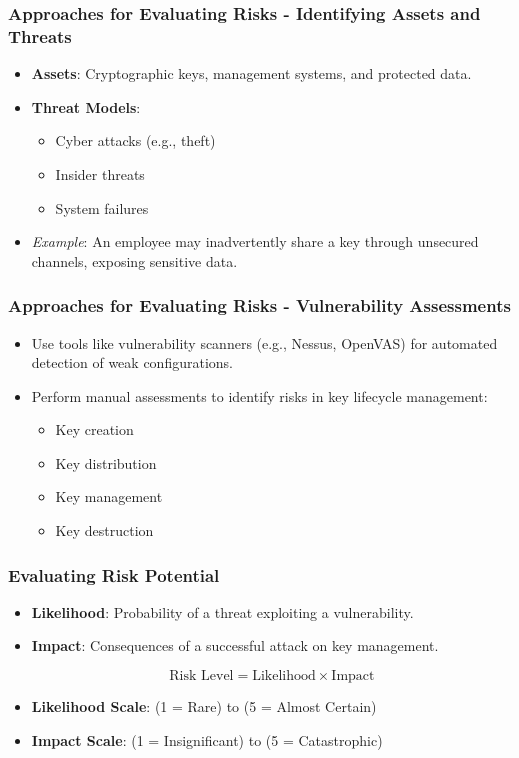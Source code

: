 \documentclass{beamer}
\begin{document}
\begin{frame}[fragile]
    \frametitle{Approaches for Evaluating Risks - Identifying Assets and Threats}
    \begin{itemize}
        \item \textbf{Assets}: Cryptographic keys, management systems, and protected data.
        \item \textbf{Threat Models}:
        \begin{itemize}
            \item Cyber attacks (e.g., theft)
            \item Insider threats
            \item System failures
        \end{itemize}
        \item \textit{Example}: An employee may inadvertently share a key through unsecured channels, exposing sensitive data.
    \end{itemize}
\end{frame}

\begin{frame}[fragile]
    \frametitle{Approaches for Evaluating Risks - Vulnerability Assessments}
    \begin{itemize}
        \item Use tools like vulnerability scanners (e.g., Nessus, OpenVAS) for automated detection of weak configurations.
        \item Perform manual assessments to identify risks in key lifecycle management:
        \begin{itemize}
            \item Key creation
            \item Key distribution
            \item Key management
            \item Key destruction
        \end{itemize}
    \end{itemize}
\end{frame}

\begin{frame}[fragile]
    \frametitle{Evaluating Risk Potential}
    \begin{itemize}
        \item \textbf{Likelihood}: Probability of a threat exploiting a vulnerability.
        \item \textbf{Impact}: Consequences of a successful attack on key management.
        
        \begin{equation}
        \text{Risk Level} = \text{Likelihood} \times \text{Impact}
        \end{equation}
        
        \item \textbf{Likelihood Scale}: (1 = Rare) to (5 = Almost Certain)
        \item \textbf{Impact Scale}: (1 = Insignificant) to (5 = Catastrophic)
    \end{itemize}
\end{frame}
\end{document}
